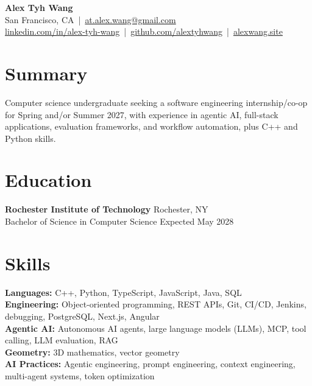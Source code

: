 \documentclass[10pt,letterpaper]{article}
\begin{document}
\begin{center}
{\Large \textbf{Alex Tyh Wang}}\\
San Francisco, CA \,|\, \href{mailto:at.alex.wang@gmail.com}{at.alex.wang@gmail.com}\\
\small \href{https://www.linkedin.com/in/alex-tyh-wang/}{linkedin.com/in/alex-tyh-wang} \,|\, \href{https://github.com/alextyhwang}{github.com/alextyhwang} \,|\, \href{https://alexwang.site}{alexwang.site}
\end{center}

\section*{Summary}
Computer science undergraduate seeking a software engineering internship/co-op for Spring and/or Summer 2027, with experience in agentic AI, full-stack applications, evaluation frameworks, and workflow automation, plus C++ and Python skills.

\section*{Education}
\textbf{Rochester Institute of Technology} \hfill Rochester, NY\\
Bachelor of Science in Computer Science \hfill Expected May 2028

\section*{Skills}
\textbf{Languages:} C++, Python, TypeScript, JavaScript, Java, SQL\\
\textbf{Engineering:} Object-oriented programming, REST APIs, Git, CI/CD, Jenkins, debugging, PostgreSQL, Next.js, Angular\\
\textbf{Agentic AI:} Autonomous AI agents, large language models (LLMs), MCP, tool calling, LLM evaluation, RAG\\
\textbf{Geometry:} 3D mathematics, vector geometry\\
\textbf{AI Practices:} Agentic engineering, prompt engineering, context engineering, multi-agent systems, token optimization
\end{document}
